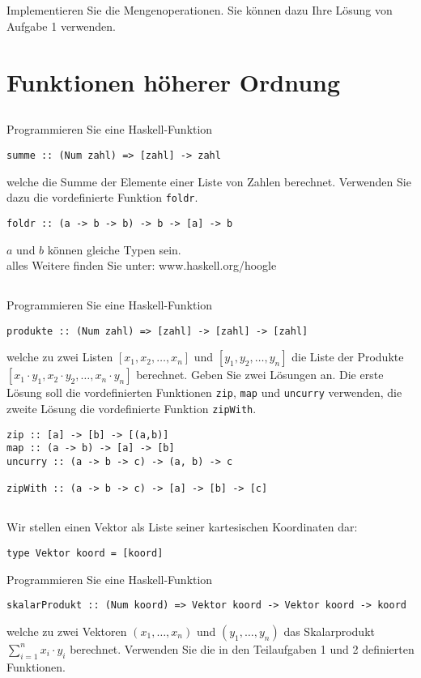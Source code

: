 \documentclass[
  10pt,                   %
  DIV12,
  german,                 %
  oneside,                %
  parskip=half,           %
  headings=normal,        %
  captions=tableheading,  %
]{scrartcl}
\begin{document}
\subsection{}
Implementieren Sie die Mengenoperationen. Sie können dazu Ihre Lösung von
Aufgabe 1 verwenden.

\section{Funktionen höherer Ordnung}
\subsection{}
Programmieren Sie eine Haskell-Funktion 
\begin{lstlisting}
summe :: (Num zahl) => [zahl] -> zahl
\end{lstlisting}
welche die Summe der Elemente einer Liste von Zahlen berechnet. Verwenden Sie
dazu die vordefinierte Funktion \lstinline|foldr|.\\
\begin{lstlisting}
foldr :: (a -> b -> b) -> b -> [a] -> b
\end{lstlisting}
$a$ und $b$ können gleiche Typen sein.\\
alles Weitere finden Sie unter: www.haskell.org/hoogle
\subsection{}
Programmieren Sie eine Haskell-Funktion 
\begin{lstlisting}
produkte :: (Num zahl) => [zahl] -> [zahl] -> [zahl]
\end{lstlisting}
welche zu zwei Listen $[x_1, x_2, \ldots , x_n]$ und $[y_1, y_2, \ldots, y_n]$ die Liste der Produkte
$[x_1 \cdot y_1, x_2 \cdot y_2, \ldots, x_n \cdot y_n]$
berechnet. Geben Sie zwei Lösungen an. Die erste Lösung soll die vordefinierten
Funktionen \lstinline|zip|, \lstinline|map| und \lstinline|uncurry| verwenden, die zweite Lösung die vordefinierte
Funktion \lstinline|zipWith|.
\begin{lstlisting}
zip :: [a] -> [b] -> [(a,b)]
map :: (a -> b) -> [a] -> [b]
uncurry :: (a -> b -> c) -> (a, b) -> c

zipWith :: (a -> b -> c) -> [a] -> [b] -> [c]
\end{lstlisting}
\subsection{}
Wir stellen einen Vektor als Liste seiner kartesischen Koordinaten dar:
\begin{lstlisting}
type Vektor koord = [koord]
\end{lstlisting}
Programmieren Sie eine Haskell-Funktion
\begin{lstlisting}
skalarProdukt :: (Num koord) => Vektor koord -> Vektor koord -> koord
\end{lstlisting}
welche zu zwei Vektoren $(x_1, \ldots , x_n)$ und $(y_1, \ldots ,y_n)$ das Skalarprodukt
$\sum^n_{i=1}{x_i \cdot y_i}$ berechnet. Verwenden Sie die in den Teilaufgaben 1 und 2 definierten Funktionen.
\end{document}
